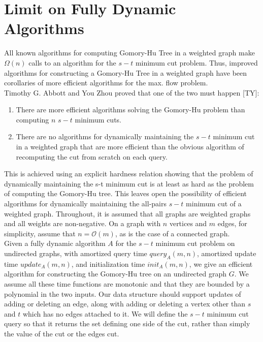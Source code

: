     \clearpage
    \section{Limit on Fully Dynamic Algorithms}
    All known algorithms for computing Gomory-Hu Tree in a weighted graph make $\Omega(n)$ calls to an algorithm for the $s-t$ minimum cut problem. Thus, improved algorithms for constructing a Gomory-Hu Tree in a weighted graph have been corollaries of more efficient algorithms for the max. flow problem. \\
    
    Timothy G. Abbott and You Zhou proved that one of the two must happen [TY]:
    \begin{enumerate}
        \item {There are more efficient algorithms solving the Gomory-Hu problem than computing $n$ $s-t$ minimum cuts.}
        \item {There are no algorithms for dynamically maintaining the $s-t$ minimum cut in a weighted graph that are more efficient than the obvious algorithm of recomputing the cut from scratch on each query.}
    \end{enumerate}
    This is achieved using an explicit hardness relation showing that the problem of dynamically maintaining the s-t minimum cut is at least as hard as the problem of computing the  Gomory-Hu tree. This leaves open the possibility of efficient algorithms for dynamically maintaining the all-pairs $s-t$ minimum cut of a weighted graph.
    Throughout, it is assumed that all graphs are weighted graphs and all weights are non-negative. On a graph with $n$ vertices and $m$ edges, for simplicity, assume that $n = \mathcal{O}(m)$, as is the case of a connected graph.\\
    \indent
    Given a fully dynamic algorithm $A$ for the $s-t$ minimum cut problem on undirected graphs, with amortized query time $query_A(m, n)$, amortized update time $update_A(m, n)$, and initialization time $init_A(m, n)$, we give an efficient algorithm for constructing the Gomory-Hu tree on an undirected graph $G$. We assume all these time functions are monotonic and that they are bounded by a polynomial in the two inputs.
    Our data structure should support updates of adding or deleting an edge, along with adding or deleting a vertex other than $s$ and $t$ which has no edges attached to it. We will define the $s-t$ minimum cut query so that it returns the set defining one side of the cut, rather than simply the value of the cut or the edges cut.

